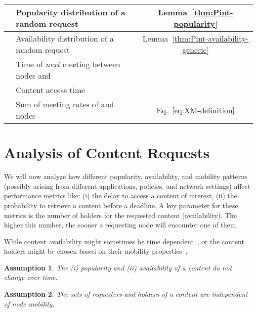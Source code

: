 \documentclass[journal]{IEEEtran}
\newtheorem{assumption}{Assumption}
\newcommand{\eq}[1]{Eq.~\eqref{#1}}
\begin{document}
\begin{table}
\begin{scriptsize}
\begin{tabular}{|l|l|c|}
\hline
	& Popularity distribution of a random request&{Lemma~\ref{thm:Pint-popularity}}\\
\hline
	& Availability distribution of a random request&{Lemma~\ref{thm:Pint-availability-generic}}\\
\hline
	& Time of \textit{next} meeting between nodes  and &{}\\
\hline
	& Content access time &{}\\
\hline
	& Sum of meeting rates of  and nodes &{\eq{eq:XM-definition}}\\
\hline
\end{tabular}
\end{scriptsize}
\label{table:notation}
\end{table}




\section{Analysis of Content Requests}\label{sec:analysis}
We will now analyze how different popularity, availability, and mobility patterns (possibly arising from different applications, policies, and network settings) affect performance metrics like: (i) the delay to access a content of interest, (ii) the probability to retrieve a content before a  deadline. A key parameter for these metrics is the number of holders for the requested content (availability). The higher this number, the sooner a requesting node will encounter one of them.  

While content availability might sometimes be time dependent~\cite{CEDO}, or the content holders might be chosen based on their mobility properties~\cite{multiple-offloading}, 

\begin{assumption}\label{ass:availability-time-independence}
The (i) popularity  and (ii) availability  of a content  do not change over time.
\end{assumption}

\begin{assumption}\label{ass:traffic-mobility-independence}The sets of requesters  and holders  of a content  are independent of node mobility.
\end{assumption} 
\end{document}
